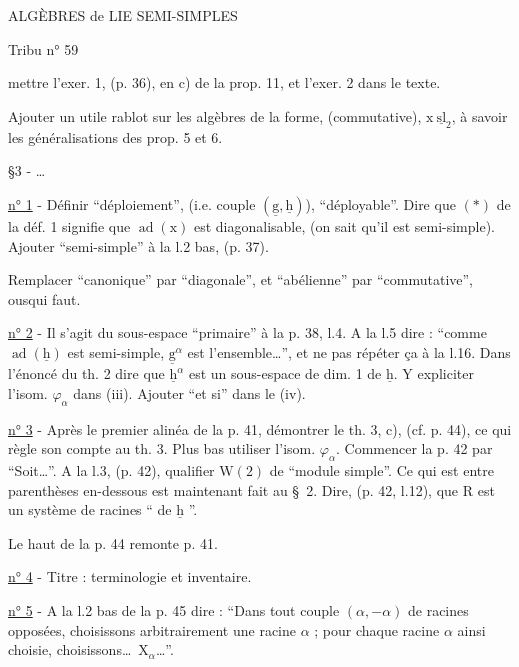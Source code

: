 ALGÈBRES de LIE SEMI-SIMPLES 

Tribu n° 59

mettre l'exer. 1, (p. 36), en c) de la prop. 11, et l'exer. 2 dans le texte.

Ajouter un utile rablot sur les algèbres de la forme, (commutative), $\mathrm{x}\ \underline{\mathrm{sl}}_2$, à savoir les généralisations des prop. 5 et 6.

\S3 - \ldots

\uline{n° 1} - Définir ``déploiement'', (i.e. couple $(\underline{\mathrm{g}},\underline{\mathrm{h}})$), ``déployable''. Dire que $(*)$ de la déf. 1 signifie que $\operatorname{ad}(\mathrm{x})$ est diagonalisable, (on sait qu'il est semi-simple). Ajouter ``semi-simple'' à la l.2 bas, (p. 37).

Remplacer ``canonique'' par ``diagonale'', et ``abélienne'' par ``commutative'', ousqui faut.

\uline{n° 2} - Il s'agit du sous-espace ``primaire'' à la p. 38, l.4. A la l.5 dire : ``comme $\operatorname{ad}(\underline{\mathrm{h}})$ est semi-simple, $\underline{\mathrm{g}}^\alpha$ est l'ensemble\ldots'', et ne pas répéter ça à la l.16. Dans l'énoncé du th. 2 dire que $\underline{\mathrm{h}}^\alpha$ est un sous-espace de dim. 1 de $\underline{\mathrm{h}}$. Y expliciter l'isom. $\varphi_\alpha$ dans (iii). Ajouter ``et si'' dans le (iv).

\uline{n° 3} - Après le premier alinéa de la p. 41, démontrer le th. 3, c), (cf. p. 44), ce qui règle son compte au th. 3. Plus bas utiliser l'isom. $\varphi_\alpha$. Commencer la p. 42 par ``Soit\ldots''. A la l.3, (p. 42), qualifier $\mathrm{W}(2)$ de ``module simple''. Ce qui est entre parenthèses en-dessous est maintenant fait au \S\ 2. Dire, (p. 42, l.12), que $\mathrm{R}$ est un système de racines `` de $\underline{\mathrm{h}}$ ''.

Le haut de la p. 44 remonte p. 41.

\uline{n° 4} - Titre : terminologie et inventaire.

\uline{n° 5} - A la l.2 bas de la p. 45 dire : ``Dans tout couple $(\alpha,-\alpha)$ de racines opposées, choisissons arbitrairement une racine $\alpha$ ; pour chaque racine $\alpha$ ainsi choisie, choisissons\ldots\ $\mathrm{X}_\alpha$\ldots''.

